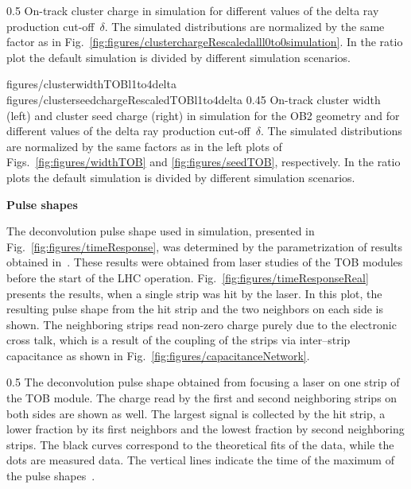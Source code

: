                 {0.5}       %
                 {  On-track cluster charge in simulation for different values of the delta ray production cut-off~$\delta$. The simulated distributions are normalized by the same factor as in Fig.~\ref{fig:figures/clusterchargeRescaledalll0to0simulation}. In the ratio plot the default simulation is divided by different simulation scenarios. }

                 {figures/clusterwidthTOBl1to4delta}
                 {figures/clusterseedchargeRescaledTOBl1to4delta} %
                 {0.45}       %
                 {  On-track cluster width (left) and cluster seed charge (right) in simulation for the OB2 geometry and for different values of the delta ray production cut-off~$\delta$.   The simulated distributions are normalized by the same factors as in the left plots of Figs.~\ref{fig:figures/widthTOB} and \ref{fig:figures/seedTOB}, respectively.  In the ratio plots the default simulation is divided by different simulation scenarios. }

\newpage
\textbf{Pulse shapes}

The deconvolution pulse shape used in simulation, presented in Fig.~\ref{fig:figures/timeResponse}, was determined by the parametrization of results obtained in~\cite{Delaere:1061284}. These results were obtained from laser studies of the TOB modules before the start of the LHC operation. Fig.~\ref{fig:figures/timeResponseReal} presents the results, when a single strip was hit by the laser. In this plot, the resulting pulse shape from the hit strip and the two neighbors on each side is shown. The neighboring strips read non-zero charge purely due to the electronic cross talk, which is a result of the coupling of the strips via inter--strip capacitance as shown in Fig.~\ref{fig:figures/capacitanceNetwork}. 



                 {0.5}       %
                 { The deconvolution pulse shape obtained from focusing a laser on one strip of the TOB module. The charge read by the first and second neighboring strips on both sides are shown as well. The largest signal is collected by the hit strip, a lower fraction by its first neighbors and the lowest fraction by second neighboring strips. The black curves correspond to the theoretical fits of the data, while the dots are measured data. The vertical lines indicate the time of the maximum of the pulse shapes~\cite{Delaere:1061284}.  }

